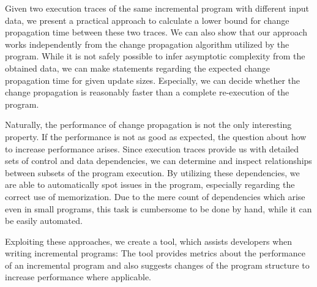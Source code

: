 Given two execution traces of the same incremental program with different input data, we present a practical approach to calculate a lower bound for change propagation time between these two traces. We can also show that our approach works independently from the change propagation algorithm utilized by the program. While it is not safely possible to infer asymptotic complexity from the obtained data, we can make statements regarding the expected change propagation time for given update sizes. Especially, we can decide whether the change propagation is reasonably faster than a complete re-execution of the program. 

Naturally, the performance of change propagation is not the only interesting property. If the performance is not as good as expected, the question about how to increase performance arises. Since execution traces provide us with detailed sets of control and data dependencies, we can determine and inspect relationships between subsets of the program execution. By utilizing these dependencies, we are able to automatically spot issues in the program, especially regarding the correct use of memorization. Due to the mere count of dependencies which arise even in small programs, this task is cumbersome to be done by hand, while it can be easily automated. 

Exploiting these approaches, we create a tool, which assists developers when writing incremental programs: The tool provides metrics about the performance of an incremental program and also suggests changes of the program structure to increase performance where applicable. 